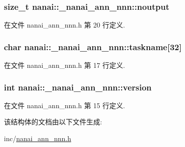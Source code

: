 \subsubsection[{noutput}]{\setlength{\rightskip}{0pt plus 5cm}size\+\_\+t nanai\+::\+\_\+nanai\+\_\+ann\+\_\+nnn\+::noutput}\label{structnanai_1_1__nanai__ann__nnn_aa0dc46c72569cc28a7e6282413d1a68f}


在文件 nanai\+\_\+ann\+\_\+nnn.\+h 第 20 行定义.

\hypertarget{structnanai_1_1__nanai__ann__nnn_ae2b106d80b290da6c7cf6b73cec66ba0}{}
\subsubsection[{taskname}]{\setlength{\rightskip}{0pt plus 5cm}char nanai\+::\+\_\+nanai\+\_\+ann\+\_\+nnn\+::taskname\mbox{[}32\mbox{]}}\label{structnanai_1_1__nanai__ann__nnn_ae2b106d80b290da6c7cf6b73cec66ba0}


在文件 nanai\+\_\+ann\+\_\+nnn.\+h 第 17 行定义.

\hypertarget{structnanai_1_1__nanai__ann__nnn_ab986fa5da43831770820c02fd91bc35f}{}
\subsubsection[{version}]{\setlength{\rightskip}{0pt plus 5cm}int nanai\+::\+\_\+nanai\+\_\+ann\+\_\+nnn\+::version}\label{structnanai_1_1__nanai__ann__nnn_ab986fa5da43831770820c02fd91bc35f}


在文件 nanai\+\_\+ann\+\_\+nnn.\+h 第 15 行定义.



该结构体的文档由以下文件生成\+:\begin{DoxyCompactItemize}
\item 
inc/\hyperlink{nanai__ann__nnn_8h}{nanai\+\_\+ann\+\_\+nnn.\+h}\end{DoxyCompactItemize}
